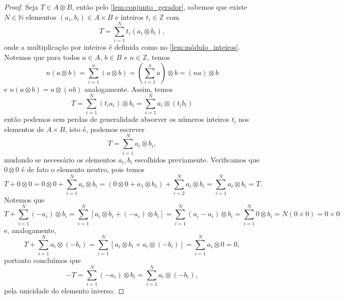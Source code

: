 \begin{proof}
    Seja \(T \in A \otimes B\), então pelo \cref{lem:conjunto_gerador}, sabemos que existe \(N \in \mathbb{N}\) elementos \((a_i, b_i) \in A\times B\) e inteiros \(t_i \in \mathbb{Z}\) com
    \begin{equation*}
        T = \sum_{i = 1}^N t_i (a_i \otimes b_i),
    \end{equation*}
    onde a multiplicação por inteiros é definida como no \cref{lem:módulo_inteiros}. Notemos que para todos \(a \in A\), \(b \in B\) e \(n \in \mathbb{Z}\), temos
    \begin{equation*}
        n (a \otimes b) = \sum_{i = 1}^n\left(a \otimes b\right) = \left(\sum_{i = 1}^n a\right) \otimes b = (n a)\otimes b
    \end{equation*}
    e \(n (a \otimes b) = a \otimes (n b)\) analogamente. Assim, temos
    \begin{equation*}
        T = \sum_{i = 1}^N (t_i a_i) \otimes b_i = \sum_{i = 1}^N a_i \otimes (t_i b_i)
    \end{equation*}
    então podemos sem perdas de generalidade absorver os números inteiros \(t_i\) nos elementos de \(A \times B\), isto é, podemos escrever
    \begin{equation*}
        T = \sum_{i = 1}^N a_i \otimes b_i,
    \end{equation*}
    mudando se necessário os elementos \(a_i, b_i\) escolhidos previamente. Verificamos que \(0 \otimes 0\) é de fato o elemento neutro, pois temos
    \begin{equation*}
        T + 0 \otimes 0 = 0 \otimes 0 + \sum_{i = 1}^N a_i \otimes b_i = (0 \otimes 0 + a_1\otimes b_1) + \sum_{i=2}^N a_i \otimes b_i = \sum_{i = 1}^N a_i \otimes b_i = T.
    \end{equation*}
    Notemos que
    \begin{equation*}
        T + \sum_{i = 1}^N (-a_i)\otimes b_i = \sum_{i = 1}^N \left[a_i \otimes b_i + (-a_i)\otimes b_i\right] = \sum_{i = 1}^N (a_i - a_i) \otimes b_i = \sum_{i = 1}^N 0 \otimes b_i = N (0 \times 0) = 0\times 0
    \end{equation*}
    e, analogamente,
    \begin{equation*}
        T + \sum_{i = 1}^N a_i\otimes (-b_i) = \sum_{i = 1}^N \left[a_i \otimes b_i + a_i\otimes (-b_i)\right] = \sum_{i = 1}^N a_i \otimes 0 = 0,
    \end{equation*}
    portanto concluímos que
    \begin{equation*}
        -T  = \sum_{i = 1}^N (-a_i)\otimes b_i = \sum_{i = 1}^N a_i \otimes (-b_i),
    \end{equation*}
    pela unicidade do elemento inverso.
\end{proof}


